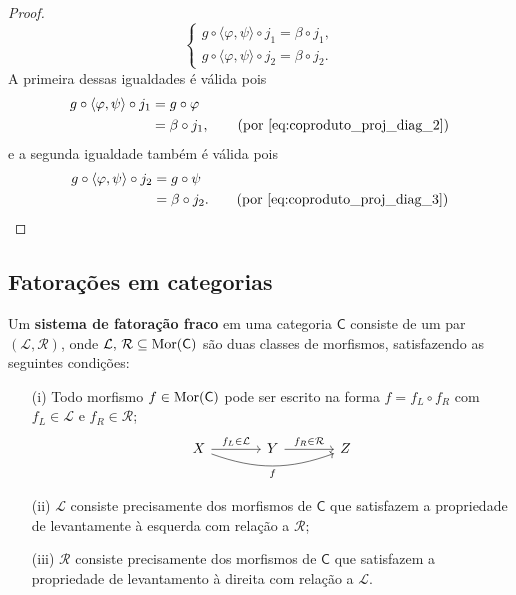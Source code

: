 \begin{proof}
  \begin{displaymath}
    \begin{cases}
      g \circ \langle \varphi,\psi \rangle \circ j_1 = \beta \circ j_1, \\
      g \circ \langle \varphi,\psi \rangle \circ j_2 = \beta \circ j_2.
    \end{cases}
  \end{displaymath}
  A primeira dessas igualdades é válida pois
  \begin{align*}
    g \circ \langle \varphi,\psi \rangle \circ j_1
    & = g \circ \varphi \\
    & = \beta \circ j_1,
    \tag{por \eqref{eq:coproduto_proj_diag_2}}
  \end{align*}
  e a segunda igualdade também é válida pois
  \begin{align*}
    g \circ \langle \varphi,\psi \rangle \circ j_2
    & = g \circ \psi \\
    & = \beta \circ j_2.
    \tag{por \eqref{eq:coproduto_proj_diag_3}}
  \end{align*}
\end{proof}

\subsection{Fatorações em categorias}

\begin{defin}
  Um \textbf{sistema de fatoração fraco} em uma categoria $\mathsf{C}$ consiste de um par $(\mathcal{L},\mathcal{R})$, onde $\mathcal{L},\, \mathcal{R} \subseteq \mathrm{Mor}(\mathsf{C})$ são duas classes de morfismos, satisfazendo as seguintes condições:
  \begin{enumerate}
  \item[(i)] Todo morfismo $f \in \mathrm{Mor}(\mathsf{C})$ pode ser escrito na forma $f = f_{L} \circ f_{R}$ com $f_{L} \in \mathcal{L}$ e $f_{R} \in \mathcal{R}$;
    \begin{displaymath}
      \begin{tikzcd}[column sep=1.25cm]
        X
        \arrow[r, "f_{L} \in \mathcal{L}"]
        \arrow[rr, bend right=20, "f" swap]
        & Y
        \arrow[r, "f_{R} \in \mathcal{R}"]
        & Z
      \end{tikzcd}
    \end{displaymath}
    
  \item[(ii)] $\mathcal{L}$ consiste precisamente dos morfismos de $\mathsf{C}$ que satisfazem a propriedade de levantamente à esquerda com relação a $\mathcal{R}$;
    
  \item[(iii)] $\mathcal{R}$ consiste precisamente dos morfismos de $\mathsf{C}$ que satisfazem a propriedade de levantamento à direita com relação a $\mathcal{L}$.
  \end{enumerate}
\end{defin}

